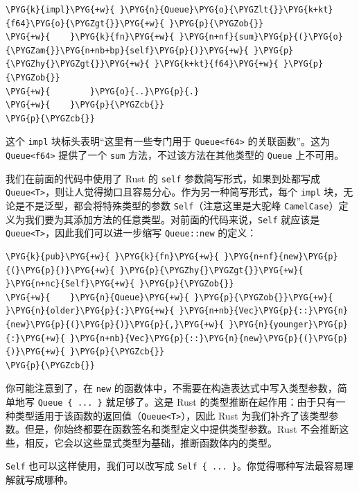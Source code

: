 \begin{Verbatim}[commandchars=\\\{\},breaklines=true,breakanywhere=true,fontsize=\codefont,xleftmargin=17bp]
\PYG{k}{impl}\PYG{+w}{ }\PYG{n}{Queue}\PYG{o}{\PYGZlt{}}\PYG{k+kt}{f64}\PYG{o}{\PYGZgt{}}\PYG{+w}{ }\PYG{p}{\PYGZob{}}
\PYG{+w}{    }\PYG{k}{fn}\PYG{+w}{ }\PYG{n+nf}{sum}\PYG{p}{(}\PYG{o}{\PYGZam{}}\PYG{n+nb+bp}{self}\PYG{p}{)}\PYG{+w}{ }\PYG{p}{\PYGZhy{}\PYGZgt{}}\PYG{+w}{ }\PYG{k+kt}{f64}\PYG{+w}{ }\PYG{p}{\PYGZob{}}
\PYG{+w}{        }\PYG{o}{..}\PYG{p}{.}
\PYG{+w}{    }\PYG{p}{\PYGZcb{}}
\PYG{p}{\PYGZcb{}}
\end{Verbatim}

这个 \texttt{impl} 块标头表明“这里有一些专门用于 \texttt{Queue<f64>} 的关联函数”。这为 \texttt{Queue<f64>} 提供了一个 \texttt{sum} 方法，不过该方法在其他类型的 \texttt{Queue} 上不可用。

我们在前面的代码中使用了 Rust 的 \texttt{self} 参数简写形式，如果到处都写成 \texttt{Queue<T>}，则让人觉得拗口且容易分心。作为另一种简写形式，每个 \texttt{impl} 块，无论是不是泛型，都会将特殊类型的参数 \texttt{Self}（注意这里是大驼峰 \texttt{CamelCase}）定义为我们要为其添加方法的任意类型。对前面的代码来说，\texttt{Self} 就应该是 \texttt{Queue<T>}，因此我们可以进一步缩写 \texttt{Queue::new} 的定义：

\begin{Verbatim}[commandchars=\\\{\},breaklines=true,breakanywhere=true,fontsize=\codefont,xleftmargin=17bp]
\PYG{k}{pub}\PYG{+w}{ }\PYG{k}{fn}\PYG{+w}{ }\PYG{n+nf}{new}\PYG{p}{(}\PYG{p}{)}\PYG{+w}{ }\PYG{p}{\PYGZhy{}\PYGZgt{}}\PYG{+w}{ }\PYG{n+nc}{Self}\PYG{+w}{ }\PYG{p}{\PYGZob{}}
\PYG{+w}{    }\PYG{n}{Queue}\PYG{+w}{ }\PYG{p}{\PYGZob{}}\PYG{+w}{ }\PYG{n}{older}\PYG{p}{:}\PYG{+w}{ }\PYG{n+nb}{Vec}\PYG{p}{::}\PYG{n}{new}\PYG{p}{(}\PYG{p}{)}\PYG{p}{,}\PYG{+w}{ }\PYG{n}{younger}\PYG{p}{:}\PYG{+w}{ }\PYG{n+nb}{Vec}\PYG{p}{::}\PYG{n}{new}\PYG{p}{(}\PYG{p}{)}\PYG{+w}{ }\PYG{p}{\PYGZcb{}}
\PYG{p}{\PYGZcb{}}
\end{Verbatim}

你可能注意到了，在 \texttt{new} 的函数体中，不需要在构造表达式中写入类型参数，简单地写 \texttt{Queue \{ ... \}} 就足够了。这是 Rust 的类型推断在起作用：由于只有一种类型适用于该函数的返回值（\texttt{Queue<T>}），因此 Rust 为我们补齐了该类型参数。但是，你始终都要在函数签名和类型定义中提供类型参数。Rust 不会推断这些，相反，它会以这些显式类型为基础，推断函数体内的类型。

\texttt{Self} 也可以这样使用，我们可以改写成 \texttt{Self \{ ... \}}。你觉得哪种写法最容易理解就写成哪种。


